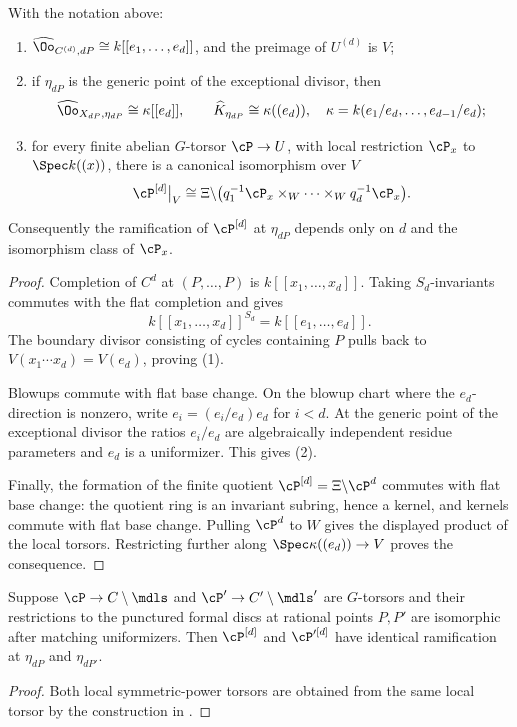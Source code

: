\begin{lemma}\label{lemma:formal_local_invariance}
With the notation above:
\begin{enumerate}
 \item $\widehat\Oo_{C^{(d)},dP}\cong k[[e_1,\dots,e_d]]$, and the preimage of
 $U^{(d)}$ is $V$;
 \item if $\eta_{dP}$ is the generic point of the exceptional divisor, then
 \begin{equation}\label{eq:complete_field_at_generic_point}
   \widehat\Oo_{X_{dP},\eta_{dP}}\cong\kappa[[e_d]],\qquad
   \widehat K_{\eta_{dP}}\cong\kappa((e_d)),
   \quad
   \kappa=k(e_1/e_d,\dots,e_{d-1}/e_d);
 \end{equation}
 \item for every finite abelian $G$-torsor $\cP\to U$, with local restriction
 $\cP_x$ to $\Spec k((x))$, there is a canonical isomorphism over $V$
 \[
   \cP^{[d]}\big|_V\cong
   \Xi\backslash
   \bigl(q_1^{-1}\cP_x\times_W\cdots\times_Wq_d^{-1}\cP_x\bigr).
 \]
\end{enumerate}
Consequently the ramification of $\cP^{[d]}$ at $\eta_{dP}$ depends only on
$d$ and the isomorphism class of $\cP_x$.
\end{lemma}
\begin{proof}
Completion of $C^d$ at $(P,\dots,P)$ is
$k[[x_1,\dots,x_d]]$. Taking $S_d$-invariants commutes with the flat
completion and gives
\[
 k[[x_1,\dots,x_d]]^{S_d}=k[[e_1,\dots,e_d]].
\]
The boundary divisor consisting of cycles containing $P$ pulls back to
$V(x_1\cdots x_d)=V(e_d)$, proving (1).

Blowups commute with flat base change. On the blowup chart where the
$e_d$-direction is nonzero, write $e_i=(e_i/e_d)e_d$ for $i<d$. At the
generic point of the exceptional divisor the ratios $e_i/e_d$ are
algebraically independent residue parameters and $e_d$ is a uniformizer.
This gives (2).

Finally, the formation of the finite quotient
$\cP^{[d]}=\Xi\backslash\cP^d$ commutes with flat base change: the quotient
ring is an invariant subring, hence a kernel, and kernels commute with flat
base change. Pulling $\cP^d$ to $W$ gives the displayed product of the local
torsors. Restricting further along
$\Spec\kappa((e_d))\to V$ proves the consequence.
\end{proof}

\begin{cor}[Reduction to $\bP^1$]\label{cor:reduction_to_P1}
Suppose $\cP\to C\setminus\mdls$ and
$\cP'\to C'\setminus\mdls'$ are $G$-torsors and their restrictions to the
punctured formal discs at rational points $P,P'$ are isomorphic after matching
uniformizers. Then $\cP^{[d]}$ and $\cP'^{[d]}$ have identical ramification at
$\eta_{dP}$ and $\eta_{dP'}$.
\end{cor}
\begin{proof}
Both local symmetric-power torsors are obtained from the same local torsor by
the construction in .
\end{proof}

